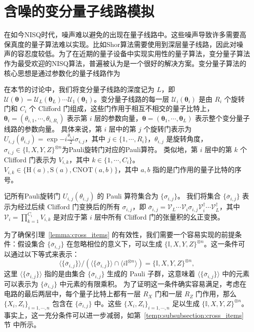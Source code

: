 
\chapter{含噪的变分量子线路模拟}\label{chap:noisy_vqa}
在如今NISQ时代，噪声难以避免的出现在量子线路中。这些噪声导致许多需要高保真度的量子算法难以实现。比如Shor算法需要使用到深层量子线路，因此对噪声的容忍度较低。为了在近期的量子设备中实现实用性的量子算法，变分量子算法作为最受欢迎的NISQ算法，普遍被认为是一个很好的解决方案。变分量子算法的核心思想是通过参数化的量子线路作为

在本节的讨论中，我们将变分量子线路的深度记为 $L$，即 $\mathcal{U}(\bm{\theta})=\mathcal{U}_L(\bm{\theta}_L)\cdots\mathcal{U}_1(\bm{\theta}_1)$。变分量子线路的每一层 $\mathcal{U}_i(\bm{\theta}_i)$ 是由 $R_i$ 个旋转门和 $C_i$ 个 Clifford 门组成，这些门作用于相互不相交的量子比特上，$\bm{\theta}_i=(\theta_{i,1},\cdots,\theta_{i,R_i})$ 表示第 $i$ 层的参数向量，$\bm{\theta}=(\bm{\theta}_1,\cdots,\bm{\theta}_L)$ 表示整个变分量子线路的参数向量。
具体来说，第 $i$ 层中的第 $j$ 个旋转门表示为 $U_{i, j}(\theta_{i,j})=\exp{-i \frac{\theta_{i,j}}{2} \sigma_{i,j}}$，其中 $j \in \{1, \cdots , R_i\}$，$\theta_{i,j}$ 是旋转角度，$\sigma_{i, j}\in \{\mathbb{I}, X,Y,Z\}^{\otimes n}$为Pauli旋转门对应的Pauli算符。
类似地，第 $i$ 层中的第 $k$ 个 Clifford 门表示为 $V_{i,k}$，其中 $k \in \{1, \cdots , C_i\}$。$V_{i,k}\in\{\mathrm{H}(a),\mathrm{S}(a),\mathrm{CNOT}(a,b)\}$，其中 $a,b $ 指的是门作用的量子比特的序号。

记所有Pauli旋转门 $U_{i,j}(\theta_{i,j})$ 的 Pauli 算符集合为 $\{\sigma_{i,j}\}$。
我们将集合 $\{\overline{\sigma}_{i,j}\}$ 表示为经过后续 Clifford 门变换后的所有 $\sigma_{i,j}$，即 $\overline{\sigma}_{i,j}= \mathcal{V}_{L} \cdots \mathcal{V}_{i} \sigma_{i,j} \mathcal{V}_{i}^\dagger \cdots \mathcal{V}_{L}^\dagger$，其中 $\mathcal{V}_{i} = \prod_{k=1}^{C_i} V_{i,k}$ 是对应于第 $i$ 层中所有 Clifford 门的张量积的幺正变换。

为了确保引理~\ref{lemma:cross_items} 的有效性，我们需要一个容易实现的前提条件：假设集合 $\{\overline{\sigma}_{i,j}\}$ 在忽略相位的意义下，可以生成 $\{\mathbb{I}, X, Y, Z\}^{\otimes n}$。这一条件可以通过以下等式来表示：
\begin{equation}\label{eq:generate}
  \langle \{\overline{\sigma}_{i,j}\}\rangle/\left(\langle \{\overline{\sigma}_{i,j}\}\rangle\cap\langle i\mathbb{I}^{\otimes n}\rangle\right)=\{\mathbb{I},X,Y,Z\}^{\otimes n},
\end{equation}
这里 $\langle \{\overline{\sigma}_{i,j}\} \rangle$ 指的是由集合 $\{\overline{\sigma}_{i,j}\}$ 生成的 Pauli 子群，这意味着 $\langle \{\overline{\sigma}_{i,j}\}\rangle$ 中的元素可以表示为 $\{\overline{\sigma}_{i,j}\}$ 中元素的有限乘积。
为了证明这一条件确实容易满足，考虑在电路的最后两层中，每个量子比特上都有一层 $R_X$ 门和一层 $R_Z$ 门作用，那么 $\{X_i, Z_i\}_{i=1,\cdots,n}$ 包含在 $\{\overline{\sigma}_{i,j}\}$ 中。这些 $\{ X_i,Z_i \}_{i=1,\cdots,n}$ 足以生成 $\{\mathbb{I},X,Y,Z\}^{\otimes n}$。事实上，这一充分条件可以进一步减弱，如第~\ref{temp:subsubsection:cross_items}节 中所示。


